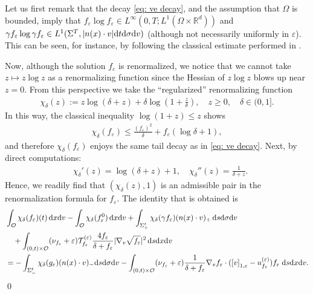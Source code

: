 \documentclass[10pt, reqno]{amsart}
\theoremstyle{plain}
\theoremstyle{definition}
\theoremstyle{remark}
\renewenvironment{proof}[1][\proofname]{\noindent{\scshape #1.\quad}}{\qed}
\numberwithin{equation}{section}
\newcommand{\calO}{\mathcal O}
\newcommand{\calT}{\mathcal T}
\newcommand{\R}{\mathbb{R}}
\newcommand{\ve}{\varepsilon}
\newcommand{\dx}{\textnormal{d}x}
\newcommand{\dv}{\textnormal{d}v}
\newcommand{\dt}{\textnormal{d}t}
\newcommand{\ds}{\textnormal{d}s}
\newcommand{\tnd}{\textnormal{d}}
\newcommand{\lt}{\left}
\newcommand{\rt}{\right}
\newcommand{\renorm}[3]{\lt[#1\rt]_{#2 , #3}}
\begin{document}
\begin{proof}
    Let us first remark that the decay \eqref{eq: ve decay}, and the assumption that $\Omega$ is bounded, imply that $f_\ve \log f_\ve \in L^\infty(0,T;L^1(\Omega\times\R^d))$ and $\gamma f_\ve \log \gamma f_\ve \in L^1(\Sigma^T,|n(x)\cdot v|\dt\tnd\sigma\dv)$ (although not necessarily uniformly in $\ve$). This can be seen, for instance, by following the classical estimate performed in \cite[pp.7--8]{JKO98}. 

    Now, although the solution $f_\ve$ is renormalized, we notice that we cannot take $z\mapsto z\log z$ as a renormalizing function since the Hessian of $z\log z$ blows up near $z=0$. From this perspective we take the ``regularized'' renormalizing function
    \begin{align*}
        \chi_\delta(z) := z \log (\delta + z) + \delta \log\left(1 + \frac{z}{\delta}\right), \quad z\ge 0, \quad \delta\in (0,1].
    \end{align*}
    In this way, the classical inequality $\log(1+z)\le z$ shows
    \begin{align}\label{eq: chidelta ineq}
        \chi_\delta(f_\ve) \le \frac{(f_\ve)^2}{\delta} + f_\ve (\log \delta + 1),
    \end{align}
    and therefore $\chi_\delta(f_\ve)$ enjoys the same tail decay as in \eqref{eq: ve decay}. Next, by direct computations:
    \begin{align*}
        &\chi_\delta'(z) = \log(\delta+z) + 1, \quad \chi_\delta''(z) = \frac{1}{\delta+z}.
    \end{align*}
    Hence, we readily find that $(\chi_\delta(z),1)$ is an admissible pair in the renormalization formula for $f_\ve$. The identity that is obtained is
    \begin{equation} \label{eq: ent prod}
    \begin{split}
        &\int_{\calO} \chi_\delta(f_\ve)(t)\,\dx\dv - \int_{\calO} \chi_\delta(f_\ve^0) \,\dx\dv + \int_{\Sigma_+^t} \chi_\delta(\gamma f_\ve) (n(x)\cdot v)_+ \,\ds\tnd\sigma\dv\\
        &\quad + \int_{(0,t)\times\calO} (\nu_{f_\ve} + \ve) \calT_{f_\ve}^{(\ve)} \frac{4f_\ve}{\delta+f_\ve} |\nabla_v \sqrt{f_\ve}|^2 \,\ds\dx\dv \\
        &= -\int_{\Sigma_-^t} \chi_\delta(g_\ve) (n(x)\cdot v)_- \ds\tnd\sigma\dv - \int_{(0,t)\times \calO} (\nu_{f_\ve} + \ve) \frac{1}{\delta+f_\ve} \nabla_v f_\ve \cdot ( \renorm{v}{1}{\ve} -u_{f_\ve}^{(\ve)} ) f_\ve \;\ds\dx\dv.
    \end{split}

\end{equation}
\end{proof}
\end{document}
